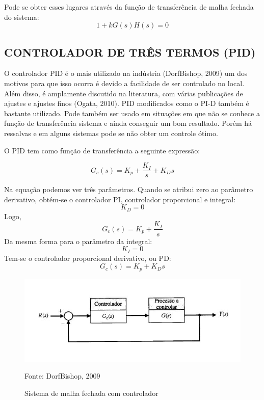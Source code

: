 \documentclass[a4paper,12pt]{article}
\begin{document}
Pode se obter esses lugares através da função de transferência de malha fechada do sistema:
\begin{equation}\label{eq:1}
1 + kG(s)H(s) = 0
\end{equation}

\subsection{CONTROLADOR DE TRÊS TERMOS (PID)}
O controlador PID é o mais utilizado na indústria (DorfBishop, 2009) um dos motivos para que isso ocorra é devido a facilidade de ser controlado no local. Além disso, é amplamente discutido na literatura, com várias publicações de ajustes e ajustes finos (Ogata, 2010). PID modificados como o PI-D também é bastante utilizado. Pode também ser usado em situações em que não se conhece a função de transferência sistema e ainda conseguir um bom resultado. Porém há ressalvas e em alguns sistemas pode se não obter um controle ótimo.

O PID tem como função de transferência a seguinte expressão:

\begin{equation}\label{eq:1}
G_c(s) = K_p + \frac{K_I}{s} + K_D s
\end{equation}

Na equação podemos ver três parâmetros. Quando se atribui zero ao parâmetro derivativo, obtém-se o controlador PI, controlador proporcional e integral:  \[K_D = 0 \] 
Logo, \[G_c(s) = K_p + \frac{K_I}{s} \]
Da mesma forma para o parâmetro da integral:
\[K_I = 0 \] 
Tem-se o controlador proporcional derivativo, ou PD: \[G_c(s) = K_p + K_D s \]

\begin{figure}[!h]
\centering
\includegraphics[scale=1]{controlador-malha-fechada.JPG}
\caption{Sistema de malha fechada com controlador}
\label{fig:sistema}
{Fonte: DorfBishop, 2009}
\end{figure}
\end{document}
